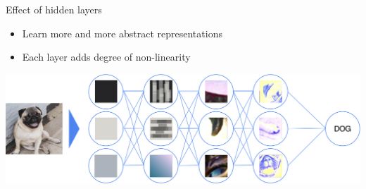 \documentclass[11pt,compress,t,notes=noshow, xcolor=table]{beamer}
\begin{document}
\begin{vbframe}{Effect of hidden layers}
\begin{itemize}
    \small \item Learn more and more abstract representations
    \small \item Each layer adds degree of non-linearity
\end{itemize}
\vspace{1cm}
\begin{center}
   \includegraphics[width = \textwidth]{slides/neural-networks/figure_man/nutshell-nn-hidden-layers.png}    
\end{center}

\end{vbframe}


\endlecture
\end{document}
